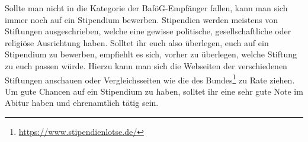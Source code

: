 Sollte man nicht in die Kategorie der BaföG-Empfänger fallen, kann man sich immer noch auf ein Stipendium bewerben. Stipendien werden meistens von Stiftungen ausgeschrieben, welche eine gewisse politische, gesellschaftliche oder religiöse Ausrichtung haben. Solltet ihr euch also überlegen, euch auf ein Stipendium zu bewerben, empfiehlt es sich, vorher zu überlegen, welche Stiftung zu euch passen würde. Hierzu kann man sich die Webseiten der verschiedenen Stiftungen anschauen oder Vergleichsseiten wie die des Bundes\footnote{\url{https://www.stipendienlotse.de/}} zu Rate ziehen. \medskip \\
Um gute Chancen auf ein Stipendium zu haben, solltet ihr eine sehr gute Note im Abitur haben und ehrenamtlich tätig sein.